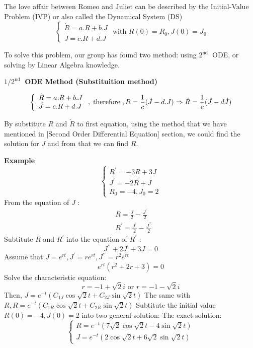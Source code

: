 \documentclass[a4paper]{article}
\begin{document}
\enskip \enskip \enskip The love affair between Romeo and Juliet can be described by the Initial-Value Problem (IVP) or also called the Dynamical System (DS)
$$
\left\{\begin{array}{l}
	\dot{R}=a . R+b . J \\
	\dot{J}=c . R+d . J
\end{array} \text { with } R(0)=R_{0}, J(0)=J_{0}\right.
$$

To solve this problem, our group has found two method: using $2^{\text {nd }}$ ODE, or solving by Linear Algebra knowledge.

{\bf  $1 / 2^{\text {nd }}$ ODE Method (Substituition method)}

$$\left\{\begin{array}{l}\dot{R}=a . R+b . J \\ \dot{J}=c . R+d . J\end{array}\right., \text{\;therefore\;}, R=\frac{1}{c}(\dot{J}-d . J) \Rightarrow \dot{R}=\frac{1}{c}(\ddot{J}-d \dot{J})$$

By substitute $R$ and $\dot{R}$ to first equation, using the method that we have mentioned in [Second Order Differential Equation] section, we could find the solution for $J$ and from that we can find $R$.

{\bf  Example}
$$
\left\{\begin{array}{c}
R^{\prime}=-3 R+3 J \\
J^{\prime}=-2 R+J \\
R_0=-4, J_0=2
\end{array}\right.
$$
From the equation of $J$ :
$$
\begin{aligned}
& R=\frac{J}{2}-\frac{J^{\prime}}{2} \\
& R^{\prime}=\frac{J^{\prime}}{2}-\frac{J^{\prime \prime}}{2}
\end{aligned}
$$
Subtitute $R$ and $R^{\prime}$ into the equation of $R^{\prime}$ :
$$
J^{\prime \prime}+2 J^{\prime}+3 J=0
$$
Assume that $J=e^{r t}, J^{\prime}=r e^{r t}, J^{\prime \prime}=r^2 e^{r t}$
$$
e^{r t}\left(r^2+2 r+3\right)=0
$$
Solve the characteristic equation:
$$
r=-1+\sqrt{2} i \text { or } r=-1-\sqrt{2} i
$$
Then, $J=e^{-t}\left(C_{1 J} \cos \sqrt{2} t+C_{2 J} \sin \sqrt{2} t\right)$
The same with $R, R=e^{-t}\left(C_{1 R} \cos \sqrt{2} t+C_{2 R} \sin \sqrt{2} t\right)$
Subtitute the initial value $R(0)=-4, J(0)=2$ into two general solution:
The exact solution:
$$
\left\{\begin{array}{l}
R=e^{-t}(7 \sqrt{2} \cos \sqrt{2} t-4 \sin \sqrt{2} t) \\
J=e^{-t}(2 \cos \sqrt{2} t+6 \sqrt{2} \sin \sqrt{2} t)
\end{array}\right.
$$
\end{document}
